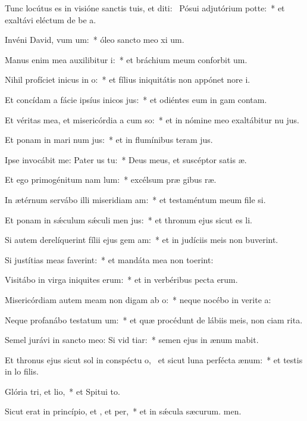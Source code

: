 \item Tunc locútus es in visióne sanctis tuis, et diti:~\pscross{} Pósui adjutórium  potte:~* et exaltávi eléctum de be a.
\item Invéni David, vum um:~* óleo sancto meo xi um.
\item Manus enim mea auxilibitur i:~* et bráchium meum conforbit um.
\item Nihil profíciet inicus in o:~* et fílius iniquitátis non appónet nore i.
\item Et concídam a fácie ipsíus inicos jus:~* et odiéntes eum in gam contam.
\item Et véritas mea, et misericórdia a cum so:~* et in nómine meo exaltábitur nu jus.
\item Et ponam in mari num jus:~* et in flumínibus teram jus.
\item Ipse invocábit me: Pater us  tu:~* Deus meus, et suscéptor satis æ.
\item Et ego primogénitum nam lum:~* excélsum præ gibus ræ.
\item In ætérnum servábo illi miseridiam am:~* et testaméntum meum file si.
\item Et ponam in sǽculum sǽculi men jus:~* et thronum ejus sicut es li.
\item Si autem derelíquerint fílii ejus gem am:~* et in judíciis meis non buverint.
\item Si justítias meas faverint:~* et mandáta mea non toerint:
\item Visitábo in virga iniquites erum:~* et in verbéribus pecta erum.
\item Misericórdiam autem meam non digam ab o:~* neque nocébo in verite a:
\item Neque profanábo testatum um:~* et quæ procédunt de lábiis meis, non ciam rita.
\item Semel jurávi in sancto meo: Si vid tiar:~* semen ejus in ænum mabit.
\item Et thronus ejus sicut sol in conspéctu o,~\pscross{} et sicut luna perfécta  ænum:~* et testis in lo filis.
\item Glória tri, et lio,~* et Spitui to.
\item Sicut erat in princípio, et , et per,~* et in sǽcula sæcurum. men.
